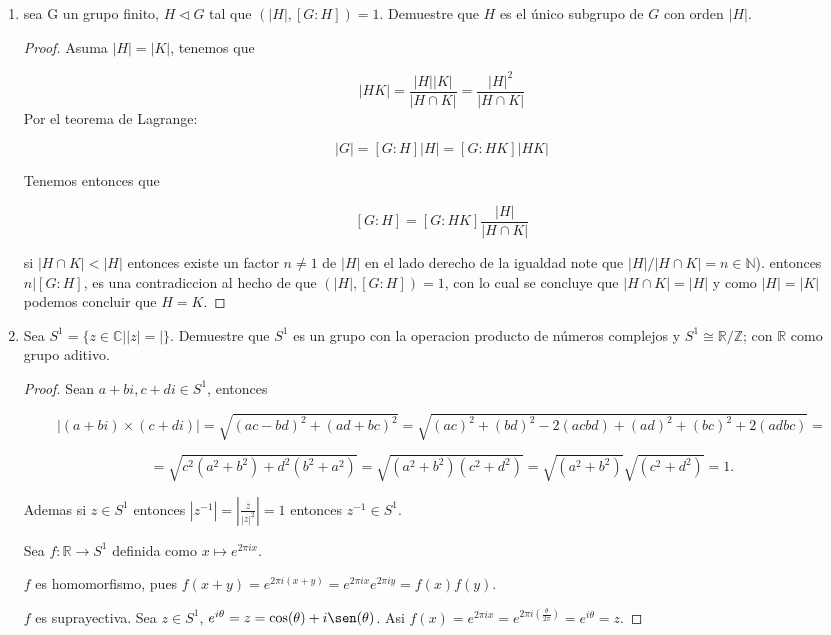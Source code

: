 \documentclass{article}
\theoremstyle{break}
\begin{document}
\begin{enumerate}
		\item sea G un grupo finito, $H\triangleleft G$ tal que $(|H|,[G:H])=1$. Demuestre que $H$ es el \'unico subgrupo de $G$ con orden $|H|$.
		
		\begin{proof}
			Asuma $|H|=|K|$, tenemos que 
			
			$$
			|HK|=\displaystyle\frac{|H||K|}{|H\cap K|}=\displaystyle\frac{|H|^2}{|H\cap K|}
			$$
			Por el teorema de Lagrange: 
			
			$$
			|G|=[G:H]|H|=[G:HK]|HK|
			$$
			
			Tenemos entonces que 
			
			$$
			[G:H]=[G:HK]\displaystyle\frac{|H|}{|H\cap K|}
			$$
			
			si $|H\cap K|<|H|$ entonces existe un factor $n\not=1$  de $|H|$ en el lado derecho de la igualdad note que $|H|/|H\cap K|=n\in\mathbb{N}$). entonces $n|[G:H]$, es una contradiccion al hecho de que $(|H|,[G:H])=1$, con lo cual se concluye que $|H\cap K|=|H|$ y como $|H|=|K|$ podemos concluir que $H=K$.
		\end{proof}
		
		
		\item Sea $S^1=\{z\in\mathbb{C}| |z|=|\}$. Demuestre que $S^1$ es un grupo con la operacion producto de n\'umeros complejos y $S^1\cong\mathbb{R}/\mathbb{Z}$; con $\mathbb{R}$ como grupo aditivo.
		
		\begin{proof}
			Sean $a+bi, c+di\in S^1$, entonces 
			
			$$|(a+bi)\times(c+di)|=\sqrt{(ac-bd)^2+(ad+bc)^2}=\sqrt{(ac)^2+(bd)^2-2(acbd)+(ad)^2+(bc)^2+2(adbc)}=
			$$
			
			$$
			=\sqrt{c^2(a^2+b^2)+d^2(b^2+a^2)}=\sqrt{(a^2+b^2)(c^2+d^2)}=\sqrt{(a^2+b^2)}\sqrt{(c^2+d^2)}=1.
			$$
			
			Ademas si $z\in S^1$ entonces $|z^{-1}|=|\frac{\overline{z}}{|z|^2}|=1$ entonces $z^{-1}\in S^1$.
			
			
			Sea $f:\mathbb{R}\rightarrow S^1$ definida como $x\mapsto e^{2\pi ix}$.
			
			$f$ es homomorfismo, pues $f(x+y)=e^{2\pi i(x+y)}=e^{2\pi ix}e^{2\pi iy}=f(x)f(y)$.
			
			$f$ es suprayectiva. Sea $z\in S^1$, $e^{i\theta}=z=\cos(\theta)+i\sen(\theta)$. Asi $f(x)=e^{2\pi ix}=e^{2\pi i(\frac{\theta}{2\pi})}=e^{i\theta}=z$.
			
			
		\end{proof}
		

\end{enumerate}
\end{document}
